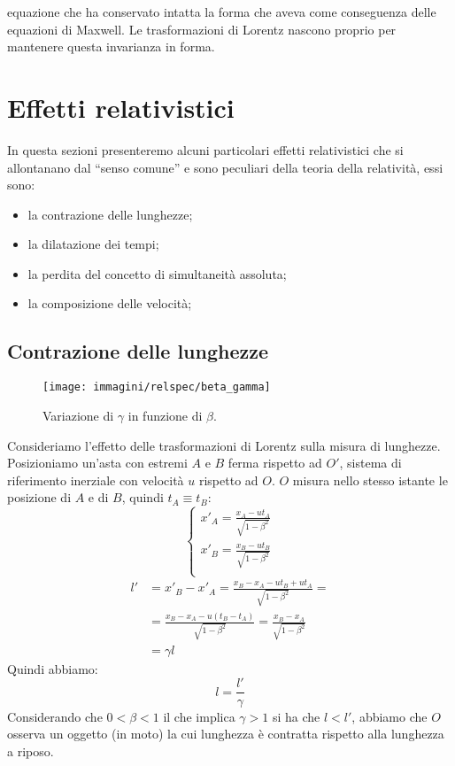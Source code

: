 equazione che ha conservato intatta la forma che aveva come conseguenza
delle equazioni di Maxwell. Le trasformazioni di Lorentz nascono proprio
per mantenere questa invarianza in forma.

\section{Effetti relativistici}
In questa sezioni presenteremo alcuni particolari effetti relativistici che si allontanano dal ``senso comune'' e sono peculiari
della teoria della relatività, essi sono:
\begin{itemize}
 \item la contrazione delle lunghezze;
 \item la dilatazione dei tempi;
 \item la perdita del concetto di simultaneità assoluta;
 \item la composizione delle velocità;
\end{itemize}

\subsection{Contrazione delle lunghezze}
\begin{figure}[htbp]
   \centering
   \texttt{[image: immagini/relspec/beta\_gamma]}
   \caption{Variazione di $\gamma$ in funzione di $\beta$.}
\end{figure}
Consideriamo l'effetto delle trasformazioni di Lorentz sulla misura di lunghezze.
Posizioniamo un'asta con estremi $A$ e $B$ ferma rispetto ad $O'$, 
sistema di riferimento inerziale con velocità $u$ rispetto ad $O$.
$O$ misura nello stesso istante le posizione di $A$ e di $B$, quindi $t_A\equiv t_B$:
\[\left\{
\begin{array}{l}
x'_A=\frac{x_A-ut_A}{\sqrt{1-\beta^2}}\\
x'_B=\frac{x_B-ut_B}{\sqrt{1-\beta^2}}\\
\end{array}
\right.\]
\begin{align*}
l' &= x'_B-x'_A=\frac{x_B-x_A-ut_B+ut_A}{\sqrt{1-\beta^2}}= \\
&= \frac{x_B-x_A-u(t_B-t_A)}{\sqrt{1-\beta^2}}=\frac{x_B-x_A}{\sqrt{1-\beta^2}}\\
&=\gamma l
\end{align*}
Quindi abbiamo:
\begin{equation}
l=\frac{l'}{\gamma}
\end{equation}
Considerando che $0<\beta<1$ il che implica $\gamma>1$ si ha che $l<l'$, abbiamo che $O$ osserva un oggetto (in moto) 
la cui lunghezza è contratta rispetto alla lunghezza a riposo.

